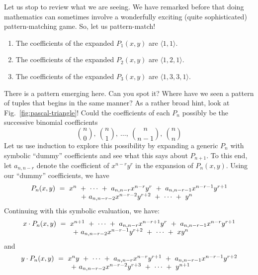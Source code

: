 Let us stop to review what we are seeing.  We have remarked before
that doing mathematics can sometimes involve a wonderfully exciting
(quite sophisticated) pattern-matching game.  So, let us pattern-match!
\begin{enumerate}
\item
The coefficients of the expanded $P_1(x,y)$ are $\langle 1,1 \rangle$.
\item
The coefficients of the expanded $P_2(x,y)$ are $\langle 1,2,1 \rangle$.
\item
The coefficients of the expanded $P_3(x,y)$ are $\langle 1,3,3,1 \rangle$.
\end{enumerate}
There is a pattern emerging here.  Can you spot it?  Where have we
seen a pattern of tuples that begins in the same manner?  As a rather
broad hint, look at Fig.~\ref{fig:pascal-triangle}!  Could the
coefficients of each $P_n$ possibly be the successive binomial
coefficients
\[ {n \choose 0}, \ {n \choose 1}, \ \ldots, \ {n \choose {n-1}}, \ {n
  \choose n}
\]
Let us use induction to explore this possibility by expanding a
generic $P_n$ with symbolic ``dummy'' coefficients and see what this
says about $P_{n+1}$.  To this end, let $a_{n,n-r}$ denote the
coefficient of $x^{n-r} y^r$ in the expansion of $P_n(x,y)$.  Using
our ``dummy'' coefficients, we have
\[ 
\begin{array}{l}
P_n(x,y) \ = \
 x^n \ + \ \cdots \ + \ a_{n,n-r} x^{n-r} y^r
    \ + \ a_{n,n-r-1} x^{n-r-1} y^{r+1} \\
\hspace*{1in} + \ a_{n,n-r-2} x^{n-r-2} y^{r+2}
 \ + \ \cdots \ + \ y^n
\end{array}
\]
Continuing with this symbolic evaluation, we have:
\begin{equation}
\label{eq:xPk}
\begin{array}{l}
x \cdot P_n(x,y) \ = \
 x^{n+1} \ + \ \cdots \ + \ a_{n,n-r} x^{n-r+1} y^r
    \ + \ a_{n,n-r-1} x^{n-r} y^{r+1} \\
\hspace*{1in} + \ a_{n,n-r-2} x^{n-r-1} y^{r+2}
 \ + \ \cdots \ + \ xy^n
\end{array}
\end{equation}
and
\begin{equation}
\label{eq:yPk}
\begin{array}{l}
y \cdot P_n(x,y) \ = \
 x^n y \ + \ \cdots \ + \ a_{n,n-r} x^{n-r} y^{r+1}
    \ + \ a_{n,n-r-1} x^{n-r-1} y^{r+2} \\
\hspace*{1in} + \ a_{n,n-r-2} x^{n-r-2} y^{r+3}
 \ + \ \cdots \ + \ y^{n+1}
\end{array}
\end{equation}
